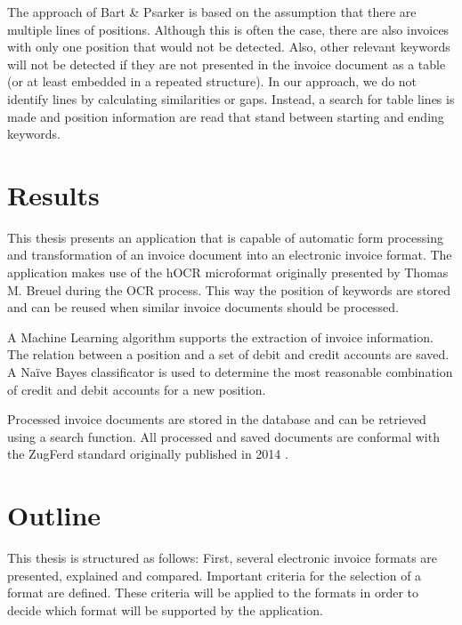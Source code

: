 The approach of Bart \& Psarker \cite{Bart10} is based on the assumption that there are multiple lines of positions. Although this is often the case, there are also invoices with only one position that would not be detected. Also, other relevant keywords will not be detected if they are not presented in the invoice document as a table (or at least embedded in a repeated structure).
In our approach, we do not identify lines by calculating similarities or gaps. Instead, a search for table lines is made and position information are read that stand between starting and ending keywords.


\section{Results}
\label{sec1.5}
This thesis presents an application that is capable of automatic form processing and transformation of an invoice document into an electronic invoice format. The application makes use of the hOCR microformat originally presented by Thomas M. Breuel \cite{Breuel07} during the OCR process. This way the position of keywords are stored and can be reused when similar invoice documents should be processed.

A Machine Learning algorithm supports the extraction of invoice information. The relation between a position and a set of debit and credit accounts are saved. A Na{\"i}ve Bayes classificator is used to determine the most reasonable combination of credit and debit accounts for a new position.

Processed invoice documents are stored in the database and can be retrieved using a search function. All processed and saved documents are conformal with the ZugFerd standard originally published in 2014 \cite{Ferd14}.

\section{Outline}
\label{sec1.6}

This thesis is structured as follows: First, several electronic invoice formats are presented, explained and compared. Important criteria for the selection of a format are defined. These criteria will be applied to the formats in order to decide which format will be supported by the application.

